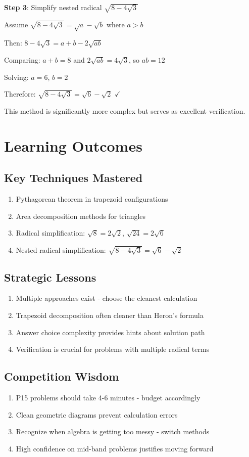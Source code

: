 \documentclass[]{article}
\begin{document}
\textbf{Step 3}: Simplify nested radical $\sqrt{8-4\sqrt{3}}$

Assume $\sqrt{8-4\sqrt{3}} = \sqrt{a} - \sqrt{b}$ where $a > b$

Then: $8 - 4\sqrt{3} = a + b - 2\sqrt{ab}$

Comparing: $a + b = 8$ and $2\sqrt{ab} = 4\sqrt{3}$, so $ab = 12$

Solving: $a = 6$, $b = 2$

Therefore: $\sqrt{8-4\sqrt{3}} = \sqrt{6} - \sqrt{2}$ $\checkmark$

This method is significantly more complex but serves as excellent verification.

\section*{Learning Outcomes}

\subsection*{Key Techniques Mastered}
\begin{enumerate}
    \item Pythagorean theorem in trapezoid configurations
    \item Area decomposition methods for triangles
    \item Radical simplification: $\sqrt{8} = 2\sqrt{2}$, $\sqrt{24} = 2\sqrt{6}$
    \item Nested radical simplification: $\sqrt{8-4\sqrt{3}} = \sqrt{6} - \sqrt{2}$
\end{enumerate}

\subsection*{Strategic Lessons}
\begin{enumerate}
    \item Multiple approaches exist - choose the cleanest calculation
    \item Trapezoid decomposition often cleaner than Heron's formula
    \item Answer choice complexity provides hints about solution path
    \item Verification is crucial for problems with multiple radical terms
\end{enumerate}

\subsection*{Competition Wisdom}
\begin{enumerate}
    \item P15 problems should take 4-6 minutes - budget accordingly
    \item Clean geometric diagrams prevent calculation errors
    \item Recognize when algebra is getting too messy - switch methods
    \item High confidence on mid-band problems justifies moving forward
\end{enumerate}
\end{document}
